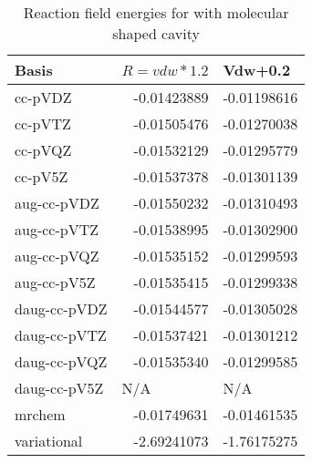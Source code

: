 \documentclass[../Thesis.tex]{subfiles}
\begin{document}
\begin{table}[htbp]
\caption{Reaction field  energies for  with molecular shaped cavity}
\begin{tabular}{l|r|r}
Basis & \multicolumn{1}{l|}{$R = vdw*1.2$} & \multicolumn{1}{l|}{Vdw+0.2} \\ \hline
cc-pVDZ & -0.01423889 & -0.01198616 \\
cc-pVTZ & -0.01505476 & -0.01270038 \\
cc-pVQZ & -0.01532129 & -0.01295779 \\
cc-pV5Z & -0.01537378 & -0.01301139 \\ \hline
aug-cc-pVDZ & -0.01550232 & -0.01310493 \\
aug-cc-pVTZ & -0.01538995 & -0.01302900 \\
aug-cc-pVQZ & -0.01535152 & -0.01299593 \\
aug-cc-pV5Z & -0.01535415 & -0.01299338 \\ \hline
daug-cc-pVDZ & -0.01544577 & -0.01305028 \\
daug-cc-pVTZ & -0.01537421 & -0.01301212 \\
daug-cc-pVQZ & -0.01535340 & -0.01299585 \\
daug-cc-pV5Z & \multicolumn{1}{l|}{N/A} & \multicolumn{1}{l|}{N/A} \\ \hline
mrchem & -0.01749631 & -0.01461535 \\
variational & -2.69241073 & -1.76175275 \\
\end{tabular}
\label{tab:abcEracetamid}
\end{table}


\biblio
\end{document}
